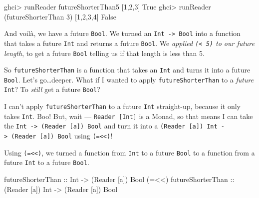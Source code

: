 \documentclass[]{article}
\newenvironment{Shaded}{}{}
\newcommand{\DataTypeTok}[1]{\textcolor[rgb]{0.56,0.13,0.00}{{#1}}}
\newcommand{\DecValTok}[1]{\textcolor[rgb]{0.25,0.63,0.44}{{#1}}}
\newcommand{\OtherTok}[1]{\textcolor[rgb]{0.00,0.44,0.13}{{#1}}}
\newcommand{\FunctionTok}[1]{\textcolor[rgb]{0.02,0.16,0.49}{{#1}}}
\newcommand{\NormalTok}[1]{{#1}}
\begin{document}
\begin{Shaded}
\begin{Highlighting}[]
\NormalTok{ghci}\FunctionTok{>} \NormalTok{runReader futureShorterThan5 [}\DecValTok{1}\NormalTok{,}\DecValTok{2}\NormalTok{,}\DecValTok{3}\NormalTok{]}
\DataTypeTok{True}
\NormalTok{ghci}\FunctionTok{>} \NormalTok{runReader (futureShorterThan }\DecValTok{3}\NormalTok{) [}\DecValTok{1}\NormalTok{,}\DecValTok{2}\NormalTok{,}\DecValTok{3}\NormalTok{,}\DecValTok{4}\NormalTok{]}
\DataTypeTok{False}
\end{Highlighting}
\end{Shaded}

And voilà, we have a future \texttt{Bool}. We turned an
\texttt{Int\ -\textgreater{}\ Bool} into a function that takes a future
\texttt{Int} and returns a future \texttt{Bool}. We \emph{applied
\texttt{(\textless{}\ 5)} to our future length}, to get a future
\texttt{Bool} telling us if that length is less than 5.

So \texttt{futureShorterThan} is a function that takes an \texttt{Int}
and turns it into a future \texttt{Bool}. Let's go\ldots{}deeper. What
if I wanted to apply \texttt{futureShorterThan} to a \emph{future}
\texttt{Int}? To \emph{still} get a future \texttt{Bool}?

I can't apply \texttt{futureShorterThan} to a future \texttt{Int}
straight-up, because it only takes \texttt{Int}. Boo! But, wait ---
\texttt{Reader\ {[}Int{]}} is a Monad, so that means I can take the
\texttt{Int\ -\textgreater{}\ (Reader\ {[}a{]})\ Bool} and turn it into
a
\texttt{(Reader\ {[}a{]})\ Int\ -\textgreater{}\ (Reader\ {[}a{]})\ Bool}
using \texttt{(=\textless{}\textless{})}!

Using \texttt{(=\textless{}\textless{})}, we turned a function from
\texttt{Int} to a future \texttt{Bool} to a function from a future
\texttt{Int} to a future \texttt{Bool}.

\begin{Shaded}
\begin{Highlighting}[]
\OtherTok{futureShorterThan       ::} \DataTypeTok{Int}              \OtherTok{->} \NormalTok{(}\DataTypeTok{Reader} \NormalTok{[a]) }\DataTypeTok{Bool}
\NormalTok{(}\FunctionTok{=<<}\NormalTok{)}\OtherTok{ futureShorterThan ::} \NormalTok{(}\DataTypeTok{Reader} \NormalTok{[a]) }\DataTypeTok{Int} \OtherTok{->} \NormalTok{(}\DataTypeTok{Reader} \NormalTok{[a]) }\DataTypeTok{Bool}
\end{Highlighting}
\end{Shaded}
\end{document}
